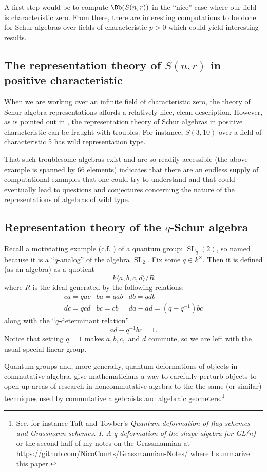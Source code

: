 \documentclass[12pt]{article}
\begin{document}
A first step would be to compute $\Db(S(n,r))$ in the ``nice'' case where our field is characteristic zero. From there, there are interesting computations to be done 
for Schur algebras over fields of characteristic $p>0$ which could yield interesting results.

\subsection{The representation theory of \texorpdfstring{$S(n,r)$}{S(n,r)} in positive characteristic}
When we are working over an infinite field of characteristic zero, the theory of Schur algebra representations affords a relatively 
nice, clean description. However, as is pointed out in \cite{erdmann}, the representation theory of Schur algebras in positive characteristic 
can be fraught with troubles. For instance, $S(3,10)$ over a field of characteristic 5 has wild representation type.

That such troublesome algebras exist and are so readily accessible (the above example is spanned by 66 elements) indicates that there are
an endless supply of computational examples that one could try to understand and that could eventually lead to questions and conjectures concerning 
the nature of the representations of algebras of wild type.

\subsection{Representation theory of the \texorpdfstring{$q$}{q}-Schur algebra}
Recall a motiviating example (c.f. \cite{majid}) of a quantum group: $\operatorname{SL}_q(2)$, so named because it is a ``$q$-analog'' of the algebra
$\operatorname{SL}_2$. Fix some $q\in k^\times$. Then it is defined (as an algebra) as a quotient 
\[k\langle a,b,c,d\rangle/R\]
where $R$ is the ideal generated by the following relations:
\[\begin{array}{ccc}
	ca=qac & ba=qab & db=qdb\\
	dc=qcd & bc=cb & da-ad=(q-q^{-1})bc
\end{array}\]
along with the ``$q$-determinant relation''
\[ad-q^{-1}bc=1.\]
Notice that setting $q=1$ makes $a,b,c,$ and $d$ commute, so we are left with the usual special linear group.

Quantum groups and, more generally, quantum deformations of objects in commutative algebra, give mathematicians 
a way to carefully perturb objects to open up areas of research in noncommutative algebra to the the same (or similar) techniques 
used by commutative algebraists and algebraic geometers.\footnote{See, for instance Taft and Towber's \textit{Quantum deformation of flag schemes and Grassmann schemes. I. A q-deformation of the shape-algebra for GL(n)}
or the second half of my notes on the Grassmannian at \href{https://github.com/NicoCourts/Grassmannian-Notes/}{https://github.com/NicoCourts/Grassmannian-Notes/} where I summarize this paper.} 
\end{document}
